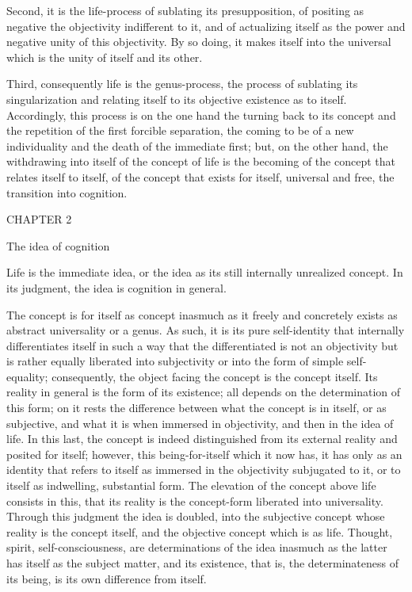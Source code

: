 Second, it is the life-process of sublating its presupposition,
of positing as negative the objectivity indifferent to it,
and of actualizing itself as the power
and negative unity of this objectivity.
By so doing, it makes itself into the universal
which is the unity of itself and its other.

Third, consequently life is the genus-process,
the process of sublating its singularization
and relating itself to its objective existence
as to itself.
Accordingly, this process is
on the one hand the turning back to its concept
and the repetition of the first forcible separation,
the coming to be of a new individuality
and the death of the immediate first;
but, on the other hand, the withdrawing into itself
of the concept of life is the becoming of
the concept that relates itself to itself,
of the concept that exists for itself,
universal and free, the transition into cognition.

CHAPTER 2

The idea of cognition

Life is the immediate idea, or the idea as
its still internally unrealized concept.
In its judgment, the idea is cognition in general.

The concept is for itself as concept
inasmuch as it freely and concretely exists
as abstract universality or a genus.
As such, it is its pure self-identity
that internally differentiates itself
in such a way that the differentiated is
not an objectivity but is rather
equally liberated into subjectivity
or into the form of simple self-equality;
consequently, the object facing
the concept is the concept itself.
Its reality in general is the form of its existence;
all depends on the determination of this form;
on it rests the difference between
what the concept is in itself, or as subjective,
and what it is when immersed in objectivity,
and then in the idea of life.
In this last, the concept is indeed distinguished
from its external reality and posited for itself;
however, this being-for-itself which it now has,
it has only as an identity that refers to itself
as immersed in the objectivity subjugated to it,
or to itself as indwelling, substantial form.
The elevation of the concept above life consists in this,
that its reality is the concept-form liberated into universality.
Through this judgment the idea is doubled,
into the subjective concept whose reality is the concept itself,
and the objective concept which is as life.
Thought, spirit, self-consciousness, are determinations
of the idea inasmuch as the latter has itself
as the subject matter, and its existence, that is, the determinateness
of its being, is its own difference from itself.

